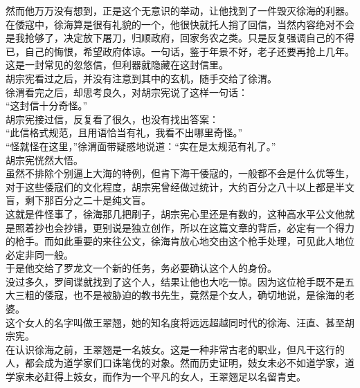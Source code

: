 \begin{multicols}{\theparacolNo}
然而他万万没有想到，正是这个无意识的举动，让他找到了一件毁灭徐海的利器。\\

在倭寇中，徐海算是很有礼貌的一个，他很快就托人捎了回信，当然内容绝对不会是我抢够了，决定放下屠刀，归顺政府，回家务农之类。只是反复强调自己的不得已，自己的悔恨，希望政府体谅。一句话，鉴于年景不好，老子还要再抢上几年。\\

这是一封常见的忽悠信，但利器就隐藏在这封信里。\\

胡宗宪看过之后，并没有注意到其中的玄机，随手交给了徐渭。\\

徐渭看完之后，却思考良久，对胡宗宪说了这样一句话：\\

“这封信十分奇怪。”\\

胡宗宪接过信，反复看了很久，也没有找出答案：\\

“此信格式规范，且用语恰当有礼，我看不出哪里奇怪。”\\

“怪就怪在这里，”徐渭面带疑惑地说道：“实在是太规范有礼了。”\\

胡宗宪恍然大悟。\\

虽然不排除个别逼上大海的特例，但肯下海干倭寇的，一般都不会是什么优等生，对于这些倭寇们的文化程度，胡宗宪曾经做过统计，大约百分之八十以上都是半文盲，剩下那百分之二十是纯文盲。\\

这就是件怪事了，徐海那几把刷子，胡宗宪心里还是有数的，这种高水平公文他就是照着抄也会抄错，更别说是独立创作，所以在这篇文章的背后，必定有一个得力的枪手。而如此重要的来往公文，徐海肯放心地交由这个枪手处理，可见此人地位必定非同一般。\\

于是他交给了罗龙文一个新的任务，务必要确认这个人的身份。\\

没过多久，罗间谍就找到了这个人，结果让他也大吃一惊。因为这位枪手既不是五大三粗的倭寇，也不是被胁迫的教书先生，竟然是个女人，确切地说，是徐海的老婆。\\

这个女人的名字叫做王翠翘，她的知名度将远远超越同时代的徐海、汪直、甚至胡宗宪。\\

在认识徐海之前，王翠翘是一名妓女。这是一种非常古老的职业，但凡干这行的人，都会成为道学家们口诛笔伐的对象。然而历史证明，妓女未必不如道学家，道学家未必赶得上妓女，而作为一个平凡的女人，王翠翘足以名留青史。\\


\end{multicols}
